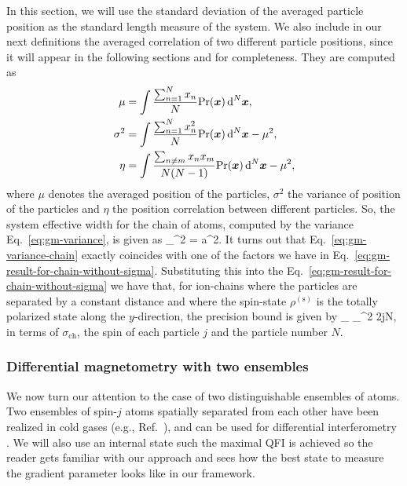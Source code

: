 In this section, we will use the standard deviation of the averaged particle position as the standard length measure of the system.
We also include in our next definitions the averaged correlation of two different particle positions, since it will appear in the following sections and for completeness.
They are computed as
\begin{subequations}
  \begin{align}
    \mu &= \int \frac{\sum_{n=1}^N x_n}{N} \text{Pr}(\boldsymbol{x}) \, \text{d}^N\boldsymbol{x},
    \label{eq:gm-mean} \\
    \sigma^2 &= \int \frac{\sum_{n=1}^N x_n^2}{N} \text{Pr}(\boldsymbol{x}) \, \text{d}^N\boldsymbol{x}  - \mu^2,
    \label{eq:gm-variance} \\
    \eta & =  \int \frac{\sum_{n\neq m} x_n x_m}{N(N-1)}\text{Pr}(\boldsymbol{x}) \, \text{d}^N\boldsymbol{x} - \mu^2,
    \label{eq:gm-correlation}
  \end{align}
\end{subequations}
where $\mu$ denotes the averaged position of the particles, $\sigma^2$ the variance of position of the particles and $\eta$ the position correlation between different particles.
So, the system effective width for the chain of atoms, computed by the variance Eq.~\eqref{eq:gm-variance}, is given as
\be
  \sigma_{}^2 = a^2.
  \label{eq:gm-variance-chain}
\ee
It turns out that Eq.~\eqref{eq:gm-variance-chain} exactly coincides with one of the factors we have in Eq.~\eqref{eq:gm-result-for-chain-without-sigma}.
Substituting this into the Eq.~\eqref{eq:gm-result-for-chain-without-sigma} we have that,
for ion-chains where the particles are separated by a constant distance and where the spin-state $\rho^{(\text{s})}$ is the totally polarized state along the $y$-direction, the precision bound is given by
\be
  _{} \leqslant \sigma_{}^2 2jN,
\ee
in terms of $\sigma_{\text{ch}}$, the spin of each particle $j$ and the particle number $N$.

\subsubsection{Differential magnetometry with two ensembles}

We now turn our attention to the case of two distinguishable ensembles of atoms.
Two ensembles of spin-$j$ atoms spatially separated from each other have been realized in cold gases (e.g., Ref.~\cite{Julsgaard2001}), and can be used for differential interferometry \cite{Eckert2006, Landini2014}.
We will also use an internal state such the maximal QFI is achieved so the reader gets familiar with our approach and sees how the best state to measure the gradient parameter looks like in our framework.

